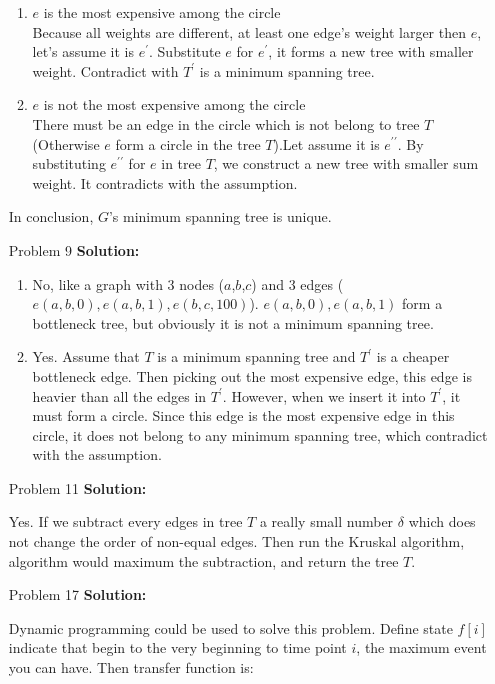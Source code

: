 \normalfont\documentclass[letterpaper,11pt]{article}
\begin{document}
\begin{enumerate}
\begin{enumerate}
	\item$e$ is the most expensive among the circle\\
		Because all weights are different, at least one edge's weight larger then $e$, let's assume it is $e^\prime$. Substitute $e$ for $e^\prime$, it forms a new tree with smaller weight. Contradict with $T^\prime$ is a minimum spanning tree.
	\item$e$ is not the most expensive among the circle\\
		There must be an edge in the circle which is not belong to tree $T$(Otherwise $e$ form a circle in the tree $T$).Let assume it is $e^{\prime\prime}$. By substituting $e^{\prime\prime}$ for $e$ in tree $T$, we construct a new tree with smaller sum weight. It contradicts with the assumption.
\end{enumerate}
In conclusion, $G$'s minimum spanning tree is unique.
\item [Problem 9]\textbf{Solution:}\par
\begin{enumerate}
	\item No, like a graph with 3 nodes ($a$,$b$,$c$) and 3 edges ($e(a,b,0),e(a,b,1),e(b,c,100)$). $e(a,b,0),e(a,b,1)$ form a bottleneck tree, but obviously it is not a minimum spanning tree.
	\item Yes. Assume that $T$ is a minimum spanning tree and $T^\prime$ is a cheaper bottleneck edge. Then picking out the most expensive edge, this edge is heavier than all the edges in $T^\prime$. However, when we insert it into $T^\prime$, it must form a circle. Since this edge is the most expensive edge in this circle, it does not belong to any minimum spanning tree, which contradict with the assumption.
\end{enumerate}
\item [Problem 11]\textbf{Solution:}\par
	Yes. If we subtract every edges in tree $T$ a really small number $\delta$ which does not change the order of non-equal edges. Then run the Kruskal algorithm, algorithm would maximum the subtraction, and return the tree $T$.
\item [Problem 17]\textbf{Solution:}\par
	Dynamic programming could be used to solve this problem. Define state $f[i]$ indicate that begin to the very beginning to time point $i$, the maximum event you can have. Then transfer function is:
	\begin{enumerate}

\end{enumerate}
\end{enumerate}
\end{document}
